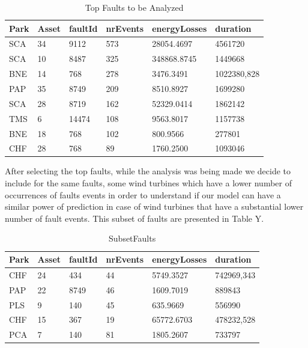 \begin{table}[!ht]
    \centering
    \begin{tabular}{|l|l|l|l|l|l|}
    \hline
        Park & Asset & faultId & nrEvents & energyLosses & duration \\ \hline
        SCA & 34 & 9112 & 573 & 28054.4697 & 4561720 \\ \hline
        SCA & 10 & 8487 & 325 & 348868.8745 & 1449668 \\ \hline
        BNE & 14 & 768 & 278 & 3476.3491 & 1022380,828 \\ \hline
        PAP & 35 & 8749 & 209 & 8510.8927 & 1699280 \\ \hline
        SCA & 28 & 8719 & 162 & 52329.0414 & 1862142 \\ \hline
        TMS & 6 & 14474 & 108 & 9563.8017 & 1157738 \\ \hline
        BNE & 18 & 768 & 102 & 800.9566 & 277801 \\ \hline
        CHF & 28 & 768 & 89 & 1760.2500 & 1093046 \\ \hline
    \end{tabular}
    \caption{Top Faults to be Analyzed}
    \label{TopFaultsTable}
\end{table}

After selecting the top faults, while the analysis was being made we decide to include for the same faults, some wind turbines which have a lower number of occurrences of faults events in order to understand if our model can have a similar power of prediction in case of wind turbines that have a substantial lower number of fault events. This subset of faults are presented in Table Y.

\begin{table}[!ht]
    \centering
    \begin{tabular}{|l|l|l|l|l|l|}
    \hline
        Park & Asset & faultId & nrEvents & energyLosses & duration \\ \hline
        CHF & 24 & 434 & 44 & 5749.3527 & 742969,343 \\ \hline
        PAP & 22 & 8749 & 46 & 1609.7019 & 889843 \\ \hline
        PLS & 9 & 140 & 45 & 635.9669 & 556990 \\ \hline
        CHF & 15 & 367 & 19 & 65772.6703 & 478232,528 \\ \hline
        PCA & 7 & 140 & 81 & 1805.2607 & 733797 \\ \hline
    \end{tabular}
    \caption{SubsetFaults}
    \label{Subset of Faults with less occurences that are going to be analyzed}
\end{table}

